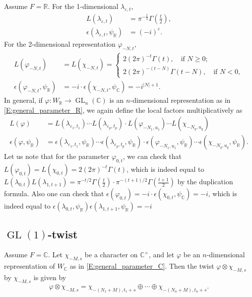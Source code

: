 \documentclass[11pt]{amsart}
\theoremstyle{plain}
\theoremstyle{definition}
\numberwithin{equation}{section}
\newcommand{\C}{\mathbb C}
\newcommand{\R}{\mathbb{R}}
\newcommand{\la}{\lambda}
\newcommand{\ep}{\varepsilon}
\newcommand{\GL}{\operatorname{GL}}
\begin{document}
Assume $F=\R$. For the 1-dimensional $\la_{\ep, t}$, 
\begin{align}
\label{E:L-factor-R1}L(\la_{\ep,t})&=\pi^{-\frac{t}{2}}\Gamma\left(\frac{t}{2}\right),\\
\label{E:ep-factor-R1}\epsilon(\la_{\ep,t},\psi_\R)&=(-i)^\ep.
\end{align}
For the 2-dimensional representation $\varphi_{-N,t}$,
\begin{align}
\label{E:L-factor-R2}L(\varphi_{-N,t})&=L(\chi_{-N,t})
=\begin{cases}2(2\pi)^{-t}\Gamma(t),\quad\text{if $N\geq 0$};\\
2(2\pi)^{-(t-N)}\Gamma(t-N),\quad\text{if $N<0$},
\end{cases}\\
\label{E:ep-factor-R2}\epsilon(\varphi_{-N,t},\psi_\R)&=-i\cdot\epsilon(\chi_{-N,t},\psi_\C)=-i^{|N|+1}.
\end{align}
In general, if $\varphi:W_\R\rightarrow\GL_n(\C)$ is an
$n$-dimensional representation as in \eqref{E:general_parameter_R}, we
again define the local factors multiplicatively as
\begin{align*}
L(\varphi)&=L(\la_{\ep_1,t_1})\cdots L(\la_{\ep_p,t_p})\cdot 
L(\varphi_{-N_1,u_1})\cdots L(\chi_{-N_q, u_q})\\
\epsilon(\varphi,\psi_\R)
&=\epsilon(\la_{\ep_1,t_1}, \psi_\R)\cdots\epsilon(\la_{\ep_p,t_p}, \psi_\R)\cdot 
\epsilon(\varphi_{-N_1,u_1}, \psi_\R)\cdots \epsilon(\chi_{-N_q, u_q},\psi_\R).
\end{align*}
Let us note that for the parameter $\varphi_{0, t}$, we can check that $L(\varphi_{0,
  t})=L(\chi_{0, t})=2(2\pi)^{-t}\Gamma(t)$, which is indeed equal to
$L(\la_{0,t})L(\la_{1,t+1})=\pi^{-t/2}\Gamma(\frac{t}{2})\cdot\pi^{-(t+1)/2}\Gamma(\frac{t+1}{2})$
by the duplication formula. Also
one can check that
$\epsilon(\varphi_{0,t})=-i\cdot\epsilon(\chi_{0,t},\psi_\C)=-i$,
which is indeed equal to $\epsilon(\la_{0,t},\psi_\R)\epsilon(\la_{1,t+1},\psi_\R)=-i$

\subsection{$\GL(1)$-twist}
Assume $F=\C$. Let $\chi_{-M,s}$ be a character on
$\C^\times$, and let $\varphi$ be an $n$-dimensional representation of
$W_\C$ as in \eqref{E:general_parameter_C}. Then the twist
$\varphi\otimes\chi_{-M,s}$ by  $\chi_{-M,s}$ is given by
\begin{equation}\label{E:twisted_general_parameter_C}
\varphi\otimes\chi_{-M,s}
=\chi_{-(N_1+M), t_1+s}\oplus\cdots\oplus\chi_{-(N_n+M), t_n+s}.
\end{equation}
\end{document}
